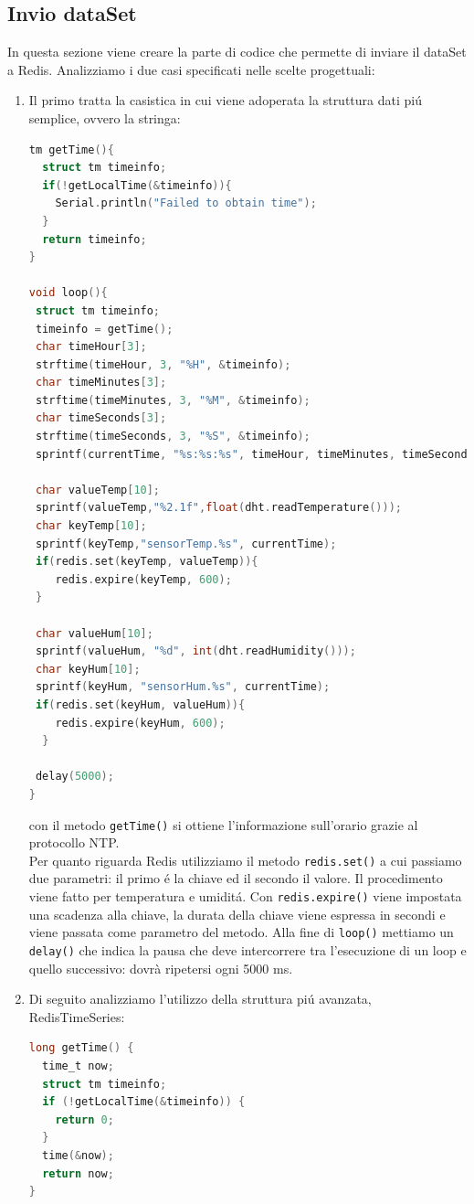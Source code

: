 \subsection{Invio dataSet}
In questa sezione viene creare la parte di codice che permette di inviare il dataSet a Redis.
Analizziamo i due casi specificati nelle scelte progettuali:
\begin{enumerate}
    \item Il primo tratta la casistica in cui viene adoperata la struttura dati piú semplice, ovvero la stringa:
\begin{lstlisting}[autogobble, style=c, language=C]
tm getTime(){
  struct tm timeinfo;
  if(!getLocalTime(&timeinfo)){
    Serial.println("Failed to obtain time");
  }
  return timeinfo;
}

void loop(){
 struct tm timeinfo;
 timeinfo = getTime();
 char timeHour[3];
 strftime(timeHour, 3, "%H", &timeinfo);
 char timeMinutes[3];
 strftime(timeMinutes, 3, "%M", &timeinfo);
 char timeSeconds[3];
 strftime(timeSeconds, 3, "%S", &timeinfo);
 sprintf(currentTime, "%s:%s:%s", timeHour, timeMinutes, timeSeconds );

 char valueTemp[10];
 sprintf(valueTemp,"%2.1f",float(dht.readTemperature()));
 char keyTemp[10];
 sprintf(keyTemp,"sensorTemp.%s", currentTime);
 if(redis.set(keyTemp, valueTemp)){
    redis.expire(keyTemp, 600);
 }

 char valueHum[10];
 sprintf(valueHum, "%d", int(dht.readHumidity()));
 char keyHum[10];
 sprintf(keyHum, "sensorHum.%s", currentTime);
 if(redis.set(keyHum, valueHum)){
    redis.expire(keyHum, 600);
  }

 delay(5000);
}\end{lstlisting}

con il metodo \texttt{getTime()} si ottiene l'informazione sull'orario grazie al protocollo NTP.\\
Per quanto riguarda Redis utilizziamo il metodo \texttt{redis.set()} a cui passiamo due parametri:
il primo é la chiave ed il secondo il valore. Il procedimento viene fatto per temperatura e umiditá.
Con \texttt{redis.expire()} viene impostata una scadenza alla chiave, la durata della chiave viene
espressa in secondi e viene passata come parametro del metodo.
Alla fine di \texttt{loop()} mettiamo un \texttt{delay()} che indica la pausa che deve intercorrere tra l'esecuzione
di un loop e quello successivo: dovrà ripetersi ogni 5000 ms.

    \item Di seguito analizziamo l'utilizzo della struttura piú avanzata, RedisTimeSeries:
\begin{lstlisting}[autogobble, style=c, language=C]
long getTime() {
  time_t now;
  struct tm timeinfo;
  if (!getLocalTime(&timeinfo)) {
    return 0;
  }
  time(&now);
  return now;
}


\end{lstlisting}
\end{enumerate}
